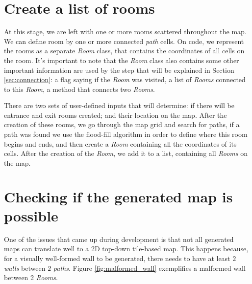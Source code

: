 \begin{figure}[h]
\begin{minipage}[b]{0.4\textwidth}
    \label{fig:20itca}
  \end{minipage}
\end{figure}

\section{Create a list of rooms}

At this stage, we are left with one or more rooms scattered throughout the map. We can define room by one or more connected \emph{path} cells. On code, we represent the rooms as a separate \emph{Room} class, that contains the coordinates of all cells on the room. It's important to note that the \emph{Room} class also contains some other important information are used by the step that will be explained in Section \ref{sec:connection}: a flag saying if the \emph{Room} was visited, a list of \emph{Rooms} connected to this \emph{Room}, a method that connects two \emph{Rooms}.

There are two sets of user-defined inputs that will determine: if there will be entrance and exit rooms created; and their location on the map. After the creation of these rooms, we go through the map grid and search for paths, if a path was found we use the flood-fill algorithm in order to define where this room begins and ends, and then create a \emph{Room} containing all the coordinates of its cells. After the creation of the \emph{Room}, we add it to a list, containing all \emph{Rooms} on the map.

\section{Checking if the generated map is possible}
\label{sec:check_poss}

One of the issues that came up during development is that not all generated maps can translate well to a 2D top-down tile-based map. This happens because, for a visually well-formed wall to be generated, there needs to have at least \(2\) \emph{walls} between \(2\) \emph{paths}. Figure \ref{fig:malformed_wall} exemplifies a malformed wall between 2 \emph{Rooms}.

